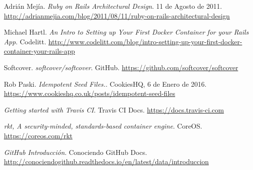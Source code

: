\begin{thebibliography}{9}
Adrián Mejía.
\textit{Ruby on Rails Architectural Design}. 
11 de Agosto de 2011.
\url{http://adrianmejia.com/blog/2011/08/11/ruby-on-rails-architectural-design}

Michael Hartl.
\textit{An Intro to Setting up Your First Docker Container for your Rails App}. 
Codelitt.
\url{http://www.codelitt.com/blog/intro-setting-up-your-first-docker-container-your-rails-app}

Softcover.
\textit{softcover/softcover}. GitHub.
\url{https://github.com/softcover/softcover}

Rob Paski.
\textit{Idempotent Seed Files.}. 
CookiesHQ, 6 de Enero de 2016.
\url{https://www.cookieshq.co.uk/posts/idempotent-seed-files}

\textit{Getting started with Travis CI}. 
Travis CI Docs.
\url{https://docs.travis-ci.com}

\textit{rkt, A security-minded, standards-based container engine}. 
CoreOS.
\url{https://coreos.com/rkt}

\textit{GitHub Introducción}. 
Conociendo GitHub Docs.
\url{http://conociendogithub.readthedocs.io/en/latest/data/introduccion}

\end{thebibliography}


